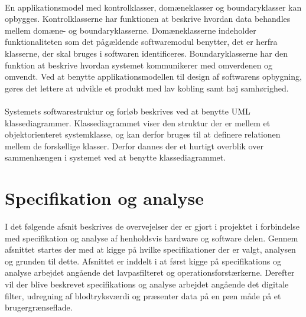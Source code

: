 \\
En applikationsmodel med kontrolklasser, domæneklasser og boundaryklasser kan opbygges. Kontrolklasserne har funktionen at beskrive hvordan data behandles mellem domæne- og boundaryklasserne. Domæneklasserne indeholder funktionaliteten som det pågældende softwaremodul benytter, det er herfra klasserne, der skal bruges i softwaren identificeres. Boundaryklasserne har den funktion at beskrive hvordan systemet kommunikerer med omverdenen og omvendt. Ved at benytte applikationsmodellen til design af softwarens opbygning, gøres det lettere at udvikle et produkt med lav kobling samt høj samhørighed. \\
\\
Systemets softwarestruktur og forløb beskrives ved at benytte UML klassediagrammer. Klassediagrammet viser den struktur der er mellem et objektorienteret systemklasse, og kan derfor bruges til at definere relationen mellem de forskellige klasser. Derfor dannes der et hurtigt overblik over sammenhængen i systemet ved at benytte klassediagrammet.  
\section{Specifikation og analyse}
I det følgende afsnit beskrives de overvejelser der er gjort i projektet i forbindelse med specifikation og analyse af henholdsvis hardware og software delen. Gennem afsnittet startes der med at kigge på hvilke specifikationer der er valgt, analysen og grunden til dette. Afsnittet er inddelt i at først kigge på specifikations og analyse arbejdet angående det lavpasfilteret og operationsforstærkerne. Derefter vil der blive beskrevet specifikations og analyse arbejdet angående det digitale filter, udregning af blodtryksværdi og præsenter data på en pæn måde på et brugergrænseflade.
